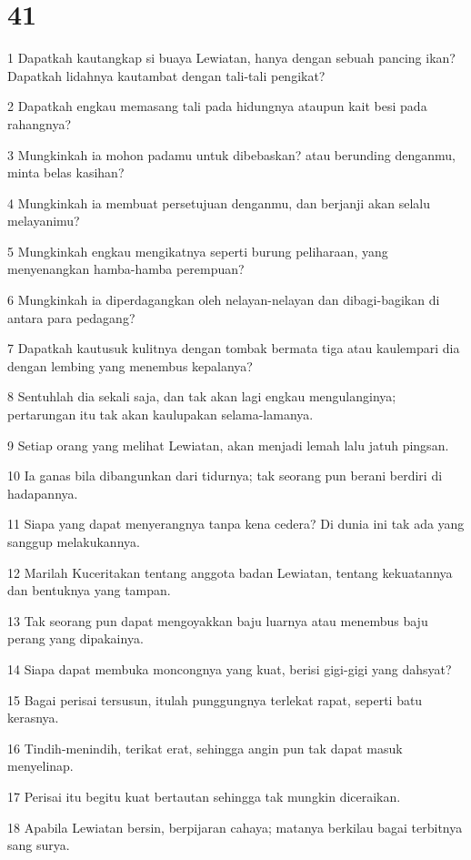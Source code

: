 \chapter{41}

\par 1 Dapatkah kautangkap si buaya Lewiatan, hanya dengan sebuah pancing ikan? Dapatkah lidahnya kautambat dengan tali-tali pengikat?
\par 2 Dapatkah engkau memasang tali pada hidungnya ataupun kait besi pada rahangnya?
\par 3 Mungkinkah ia mohon padamu untuk dibebaskan? atau berunding denganmu, minta belas kasihan?
\par 4 Mungkinkah ia membuat persetujuan denganmu, dan berjanji akan selalu melayanimu?
\par 5 Mungkinkah engkau mengikatnya seperti burung peliharaan, yang menyenangkan hamba-hamba perempuan?
\par 6 Mungkinkah ia diperdagangkan oleh nelayan-nelayan dan dibagi-bagikan di antara para pedagang?
\par 7 Dapatkah kautusuk kulitnya dengan tombak bermata tiga atau kaulempari dia dengan lembing yang menembus kepalanya?
\par 8 Sentuhlah dia sekali saja, dan tak akan lagi engkau mengulanginya; pertarungan itu tak akan kaulupakan selama-lamanya.
\par 9 Setiap orang yang melihat Lewiatan, akan menjadi lemah lalu jatuh pingsan.
\par 10 Ia ganas bila dibangunkan dari tidurnya; tak seorang pun berani berdiri di hadapannya.
\par 11 Siapa yang dapat menyerangnya tanpa kena cedera? Di dunia ini tak ada yang sanggup melakukannya.
\par 12 Marilah Kuceritakan tentang anggota badan Lewiatan, tentang kekuatannya dan bentuknya yang tampan.
\par 13 Tak seorang pun dapat mengoyakkan baju luarnya atau menembus baju perang yang dipakainya.
\par 14 Siapa dapat membuka moncongnya yang kuat, berisi gigi-gigi yang dahsyat?
\par 15 Bagai perisai tersusun, itulah punggungnya terlekat rapat, seperti batu kerasnya.
\par 16 Tindih-menindih, terikat erat, sehingga angin pun tak dapat masuk menyelinap.
\par 17 Perisai itu begitu kuat bertautan sehingga tak mungkin diceraikan.
\par 18 Apabila Lewiatan bersin, berpijaran cahaya; matanya berkilau bagai terbitnya sang surya.
